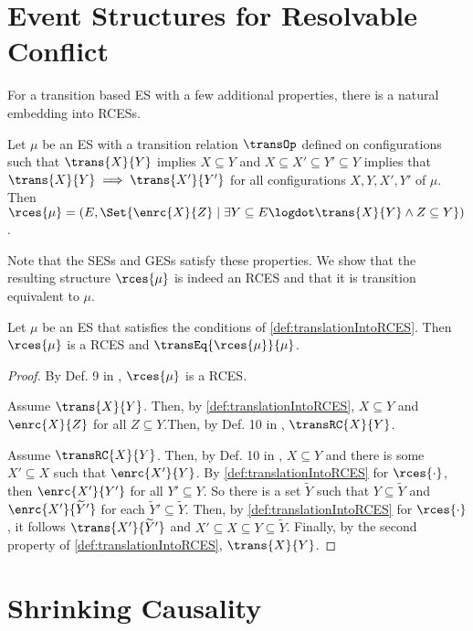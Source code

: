 \documentclass[runningheads,a4paper]{llncs}
\begin{document}
\section{Event Structures for Resolvable Conflict}

For a transition based ES with a few additional properties, there is a natural
embedding into RCESs.
\begin{definition}\label{def:translationIntoRCES}
	Let $ \mu $ be an ES with a transition relation $ \transOp $ defined on configurations such that
$ \trans{X}{Y} $ implies $ X \subseteq Y $ and
$ X \subseteq X' \subseteq Y' \subseteq Y $ implies that $ \trans{X}{Y} \implies \trans{X'}{Y'} $
for all configurations $ X, Y, X', Y' $ of $ \mu $.	Then $ \rces{\mu} = \left( E, \Set{ \enrc{X}{Z} \mid \exists Y \subseteq E \logdot \trans{X}{Y} \land Z \subseteq Y } \right) $.
\end{definition}
Note that the SESs and GESs satisfy these properties. We show that the resulting
structure $ \rces{\mu} $ is indeed an RCES and that it is transition equivalent to $ \mu $.
\begin{lemma}	\label{lma:TransInRCES}
	Let $ \mu $ be an ES that satisfies the conditions of \ref{def:translationIntoRCES}.	Then $ \rces{\mu} $ is a RCES and $  \transEq{\rces{\mu}}{\mu}$.
\end{lemma}
\begin{proof}
	By Def. 9 in \cite{dynamicCausality15}, $ \rces{\mu} $ is a RCES.
	
	Assume $ \trans{X}{Y} $. Then, by \ref{def:translationIntoRCES}, $ X \subseteq Y $ and $ \enrc{X}{Z} $ for all $ Z \subseteq Y $.Then, by Def. 10 in \cite{dynamicCausality15}, $ \transRC{X}{Y} $.
	
	Assume $ \transRC{X}{Y} $. Then, by Def. 10 in \cite{dynamicCausality15}, $ X \subseteq Y $ and there is some $ X' \subseteq X $ such that $ \enrc{X'}{Y} $. By \ref{def:translationIntoRCES} for $ \rces{\cdot} $, then $ \enrc{X'}{Y'} $ for all $ Y' \subseteq Y $. So there is a set $ \widetilde{Y} $ such that $ Y \subseteq \widetilde{Y} $ and $ \enrc{X'}{\widetilde{Y}'} $ for each $ \widetilde{Y}' \subseteq \widetilde{Y} $. Then, by \ref{def:translationIntoRCES} for $ \rces{\cdot} $, it follows $ \trans{X'}{\widetilde{Y}'} $ and $ X' \subseteq X \subseteq Y \subseteq \widetilde{Y} $. Finally, by the second property of \ref{def:translationIntoRCES}, $ \trans{X}{Y} $.
\end{proof}

\section{Shrinking Causality}
\end{document}
